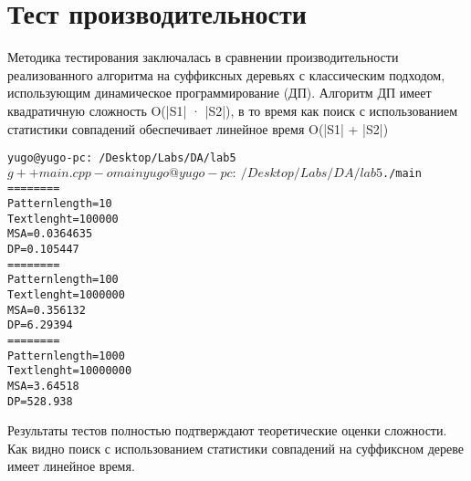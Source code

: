 \section{Тест производительности}
Методика тестирования заключалась в сравнении производительности реализованного алгоритма на суффиксных деревьях с классическим подходом, использующим
динамическое программирование (ДП). Алгоритм ДП имеет квадратичную сложность O(|S1| · |S2|), в то время как поиск с использованием статистики совпадений обеспечивает линейное время
O(|S1| + |S2|)

\begin{alltt}
yugo@yugo-pc:~/Desktop/Labs/DA/lab 5$ g++ main.cpp -o main
yugo@yugo-pc:~/Desktop/Labs/DA/lab 5$ ./main 
== == == ==
Pattern length = 10
Text lenght = 100000
MSA = 0.0364635
DP = 0.105447
== == == ==
Pattern length = 100
Text lenght = 1000000
MSA = 0.356132
DP = 6.29394
== == == ==
Pattern length = 1000
Text lenght = 10000000
MSA = 3.64518
DP = 528.938
\end{alltt}
Результаты тестов полностью подтверждают теоретические оценки сложности. Как видно поиск с использованием статистики совпадений на суффиксном дереве имеет линейное время.

\pagebreak

